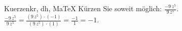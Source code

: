 \begin{MAufgabe}{Kuerzen}{kr, dh, MaTeX}
K\"urzen Sie soweit m\"oglich: $\frac{- 9\, z^5}{9\, z^5}$.\\ 
\ifLsg\MLoesung
\quad $\frac{- 9\, z^5}{9\, z^5}=\frac{(9\, z^5)\cdot(-1)}{(9\, z^5)\cdot(1)}=\frac{-1}{1}=-1$.\else\relax\fi
 \end{MAufgabe}